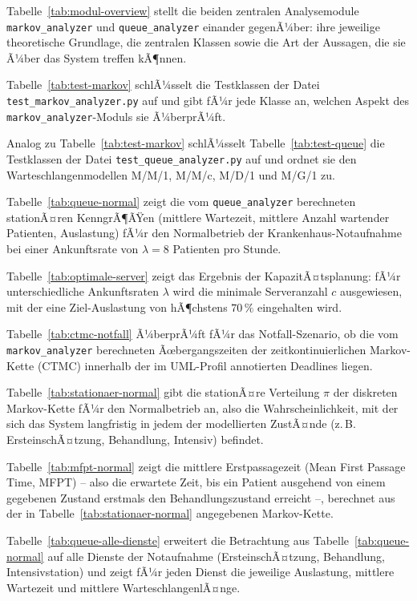 ﻿\documentclass[a4paper,12pt]{report}
\theoremstyle{definition}
\begin{document}
Tabelle~\ref{tab:modul-overview} stellt die beiden zentralen Analysemodule \texttt{markov\_analyzer} und \texttt{queue\_analyzer} einander gegenÃ¼ber: ihre jeweilige theoretische Grundlage, die zentralen Klassen sowie die Art der Aussagen, die sie Ã¼ber das System treffen kÃ¶nnen.

Tabelle~\ref{tab:test-markov} schlÃ¼sselt die Testklassen der Datei \texttt{test\_markov\_analyzer.py} auf und gibt fÃ¼r jede Klasse an, welchen Aspekt des \texttt{markov\_analyzer}-Moduls sie Ã¼berprÃ¼ft.

Analog zu Tabelle~\ref{tab:test-markov} schlÃ¼sselt Tabelle~\ref{tab:test-queue} die Testklassen der Datei \texttt{test\_queue\_analyzer.py} auf und ordnet sie den Warteschlangenmodellen M/M/1, M/M/c, M/D/1 und M/G/1 zu.

Tabelle~\ref{tab:queue-normal} zeigt die vom \texttt{queue\_analyzer} berechneten stationÃ¤ren KenngrÃ¶ÃŸen (mittlere Wartezeit, mittlere Anzahl wartender Patienten, Auslastung) fÃ¼r den Normalbetrieb der Krankenhaus-Notaufnahme bei einer Ankunftsrate von $\lambda = 8$ Patienten pro Stunde.

Tabelle~\ref{tab:optimale-server} zeigt das Ergebnis der KapazitÃ¤tsplanung: fÃ¼r unterschiedliche Ankunftsraten $\lambda$ wird die minimale Serveranzahl $c$ ausgewiesen, mit der eine Ziel-Auslastung von hÃ¶chstens $70\,\%$ eingehalten wird.

Tabelle~\ref{tab:ctmc-notfall} Ã¼berprÃ¼ft fÃ¼r das Notfall-Szenario, ob die vom \texttt{markov\_analyzer} berechneten Ãœbergangszeiten der zeitkontinuierlichen Markov-Kette (CTMC) innerhalb der im UML-Profil annotierten Deadlines liegen.

Tabelle~\ref{tab:stationaer-normal} gibt die stationÃ¤re Verteilung $\pi$ der diskreten Markov-Kette fÃ¼r den Normalbetrieb an, also die Wahrscheinlichkeit, mit der sich das System langfristig in jedem der modellierten ZustÃ¤nde (z.\,B. ErsteinschÃ¤tzung, Behandlung, Intensiv) befindet.

Tabelle~\ref{tab:mfpt-normal} zeigt die mittlere Erstpassagezeit (Mean First Passage Time, MFPT) -- also die erwartete Zeit, bis ein Patient ausgehend von einem gegebenen Zustand erstmals den Behandlungszustand erreicht --, berechnet aus der in Tabelle~\ref{tab:stationaer-normal} angegebenen Markov-Kette.

Tabelle~\ref{tab:queue-alle-dienste} erweitert die Betrachtung aus Tabelle~\ref{tab:queue-normal} auf alle Dienste der Notaufnahme (ErsteinschÃ¤tzung, Behandlung, Intensivstation) und zeigt fÃ¼r jeden Dienst die jeweilige Auslastung, mittlere Wartezeit und mittlere WarteschlangenlÃ¤nge.
\end{document}
